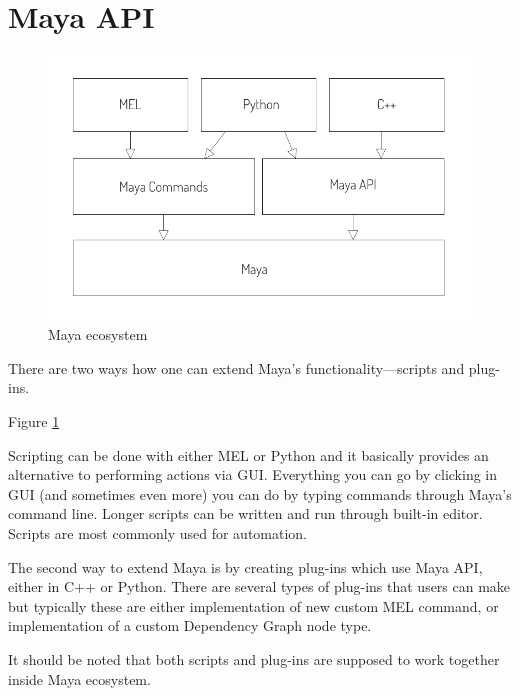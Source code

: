 \documentclass[
  digital, %
  table,   %
  nolof,     %
  nolot,     %
]{fithesis3}
\begin{document}
\section{Maya API}
\begin{figure}
  \centering
  \includegraphics[scale=0.8]{images/maya-ecosystem.pdf}
  \caption{Maya ecosystem}
  \label{fig:maya-ecosystem}
\end{figure}

There are two ways how one can extend Maya's functionality—scripts and plug-ins.

Figure \ref{fig:maya-ecosystem}

Scripting can be done with either MEL or Python and it basically provides an alternative to performing actions via GUI. Everything you can go by clicking in GUI (and sometimes even more) you can do by typing commands through Maya's command line. Longer scripts can be written and run through built-in editor. Scripts are most commonly used for automation.

The second way to extend Maya is by creating plug-ins which use Maya API, either in C++ or Python. There are several types of plug-ins that users can make but typically these are either implementation of new custom MEL command, or implementation of a custom Dependency Graph node type.

It should be noted that both scripts and plug-ins are supposed to work together inside Maya ecosystem.

\end{document}
